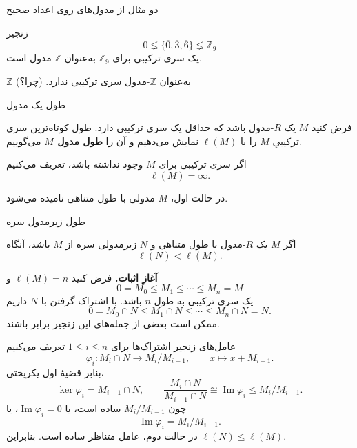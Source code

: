 \begin{frame}[t]{دو مثال از مدول‌های روی اعداد صحیح}
  \label{lec13:integer-examples}
  \begin{example}
    زنجیر
    \[
      0\lneq\{\overline{0},\overline{3},\overline{6}\}
      \lneq\mathbb Z_9
    \]
    یک سری ترکیبی برای $\mathbb Z_9$ به‌عنوان $\mathbb Z$-مدول است.
  \end{example}
  \begin{example}
    $\mathbb Z$ به‌عنوان $\mathbb Z$-مدول سری ترکیبی ندارد.
    \hfill (چرا؟)
  \end{example}
\end{frame}

\begin{frame}[t]{طول یک مدول}
  \label{lec13:length-definition}
  \begin{definition}
    فرض کنید $M$ یک $R$-مدول باشد که حداقل یک سری ترکیبی دارد.
    طول کوتاه‌ترین سری ترکیبیِ $M$ را با $\ell(M)$ نمایش می‌دهیم و آن را
    \textbf{طول مدول $M$} می‌گوییم.
    \par\medskip
    اگر سری ترکیبی برای $M$ وجود نداشته باشد، تعریف می‌کنیم
    \[
      \ell(M)=\infty.
    \]
  \end{definition}
  در حالت اول، $M$ مدولی با طول متناهی نامیده می‌شود.
\end{frame}

\begin{frame}[t]{طول زیرمدول سره}
  \label{lec13:proper-submodule-length}
  \begin{theorem}
    اگر $M$ یک $R$-مدول با طول متناهی و $N$ زیرمدولی سره از $M$ باشد، آنگاه
    \[
      \ell(N)<\ell(M).
    \]
  \end{theorem}
  \textbf{آغاز اثبات.}
  فرض کنید $\ell(M)=n$ و
  \[
    0=M_0\leqslant M_1\leqslant\cdots\leqslant M_n=M
  \]
  یک سری ترکیبی به طول $n$ باشد. با اشتراک گرفتن با $N$ داریم
  \[
    0=M_0\cap N\leqslant M_1\cap N
    \leqslant\cdots\leqslant M_n\cap N=N.
  \]
  ممکن است بعضی از جمله‌های این زنجیر برابر باشند.
\end{frame}

\begin{frame}[t]{عامل‌های زنجیر اشتراک‌ها}
  \label{lec13:intersection-factors}
  برای $1\leqslant i\leqslant n$ تعریف می‌کنیم
  \[
    \varphi_i:M_i\cap N\longrightarrow M_i/M_{i-1},
    \qquad x\longmapsto x+M_{i-1}.
  \]
  بنابر قضیهٔ اول یکریختی،
  \[
    \ker\varphi_i=M_{i-1}\cap N,
    \qquad
    \frac{M_i\cap N}{M_{i-1}\cap N}
      \cong\operatorname{Im}\varphi_i\leqslant M_i/M_{i-1}.
  \]
  چون $M_i/M_{i-1}$ ساده است، یا $\operatorname{Im}\varphi_i=0$، یا
  \[
    \operatorname{Im}\varphi_i=M_i/M_{i-1}.
  \]
  در حالت دوم، عامل متناظر ساده است. بنابراین $\ell(N)\leqslant\ell(M)$.
\end{frame}

